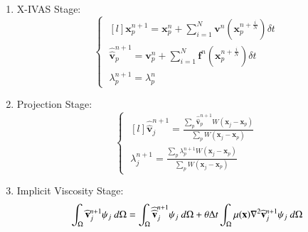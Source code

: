  \begin{program}[htbp]
	{\small
	\begin{enumerate}
	    \item X-IVAS Stage:
	    \begin{equation}
	      \left\{\;
	      \begin{matrix}[l]
		  \mathbf{x}^{n+1}_{p}=\mathbf{x}^{n}_{p}+ \sum_{i=1}^{N} \mathbf{v}^{n}(\mathbf{x}^{n+\frac{i}{N}}_{p}) \delta t \\
		  \widehat{\widehat{\mathbf{v}}}^{n+1}_{p}=\mathbf{v}^{n}_{p}+ \sum_{i=1}^{N} \mathbf{f}^{n} (\mathbf{x}^{n+\frac{i}{N}}_{p})  \delta t \\
		  \lambda_p^{n+1} =\lambda_p^n
	      \end{matrix}\;
	      \right.
	      \label{Step2step2fluids}
	    \end{equation}
	    \item Projection Stage:
	    \begin{equation}\label{Step3b2fluids}
	    \left\{\;
	      \begin{matrix}[l]
	      \displaystyle \widehat{\widehat{\mathbf{v}}}^{n+1}_{j}=\frac{\sum_{p} \widehat{\widehat{\mathbf{v}}}^{n+1}_{p} W(\mathbf{x}_{j}-\mathbf{x}_{p})}{\sum_{p} W(\mathbf{x}_{j}-\mathbf{x}_{p})} \\
	      \displaystyle \lambda^{n+1}_{j}=\frac{\sum_{p} \lambda^{n+1}_{p} W(\mathbf{x}_{j}-\mathbf{x}_{p})}{\sum_{p} W(\mathbf{x}_{j}-\mathbf{x}_{p})}
	      \end{matrix}\;
	      \right.
	    \end{equation}
	    \item Implicit Viscosity Stage:
	     \begin{eqnarray}\label{Step4a2fluids}
	      \displaystyle \int_{\Omega} \widehat{\mathbf{v}}^{n+1}_{j}\psi_j\ d\Omega =\int_{\Omega} \widehat{\widehat{\mathbf{v}}}^{n+1}_{j}\psi_j\ d\Omega + \theta \Delta t \int_{\Omega} \mu(\mathbf{x}) \nabla^{2}\widehat{\mathbf{v}}^{n+1}_{j} \psi_j\ d\Omega
	      \end{eqnarray}


\end{enumerate}}
\end{program}
